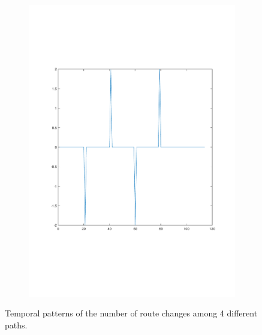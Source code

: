 \documentclass[sigconf]{acmart}
\begin{document}
\begin{figure}[!htp]
\begin{subfigure}[t]{0.4\linewidth}
		\includegraphics[width=0.95\linewidth, trim={100 100 0 0}, clip]{fig/route_change_30}
		\label{fig:3.2d}
	\end{subfigure}
	\caption{Temporal patterns of the number of route changes among 4 different paths.}
	\label{fig:3.2}
\end{figure}
\end{document}
